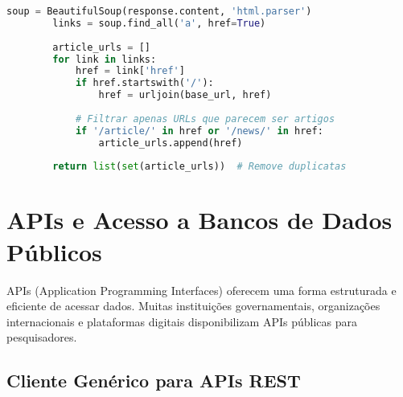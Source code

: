 \begin{pythonbox}
\begin{lstlisting}[language=Python]            
        soup = BeautifulSoup(response.content, 'html.parser')
        links = soup.find_all('a', href=True)
        
        article_urls = []
        for link in links:
            href = link['href']
            if href.startswith('/'):
                href = urljoin(base_url, href)
            
            # Filtrar apenas URLs que parecem ser artigos
            if '/article/' in href or '/news/' in href:
                article_urls.append(href)
                
        return list(set(article_urls))  # Remove duplicatas
\end{lstlisting}
\end{pythonbox}

\section{APIs e Acesso a Bancos de Dados Públicos}

APIs (Application Programming Interfaces) oferecem uma forma estruturada e eficiente de acessar dados. Muitas instituições governamentais, organizações internacionais e plataformas digitais disponibilizam APIs públicas para pesquisadores.

\subsection{Cliente Genérico para APIs REST}

